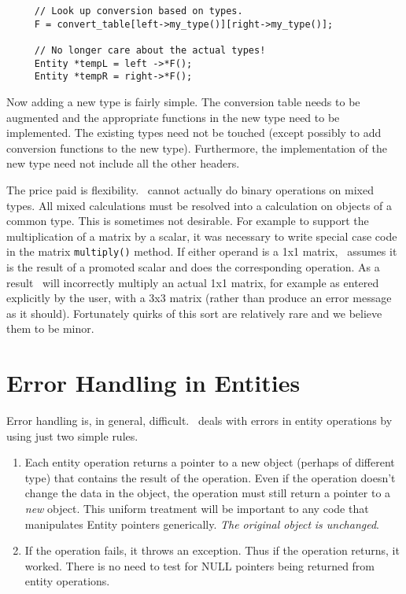 \documentclass{report}
\begin{document}
\begin{verbatim}
     // Look up conversion based on types.
     F = convert_table[left->my_type()][right->my_type()];

     // No longer care about the actual types!
     Entity *tempL = left ->*F();
     Entity *tempR = right->*F();
\end{verbatim}

Now adding a new type is fairly simple. The conversion table needs to be augmented and the
appropriate functions in the new type need to be implemented. The existing types need not be
touched (except possibly to add conversion functions to the new type). Furthermore, the
implementation of the new type need not include all the other headers.

The price paid is flexibility. \CLAC\ cannot actually do binary operations on mixed types. All
mixed calculations must be resolved into a calculation on objects of a common type. This is
sometimes not desirable. For example to support the multiplication of a matrix by a scalar, it
was necessary to write special case code in the matrix \texttt{multiply()} method. If either
operand is a 1x1 matrix, \CLAC\ assumes it is the result of a promoted scalar and does the
corresponding operation. As a result \CLAC\ will incorrectly multiply an actual 1x1 matrix, for
example as entered explicitly by the user, with a 3x3 matrix (rather than produce an error
message as it should). Fortunately quirks of this sort are relatively rare and we believe them
to be minor.

\section{Error Handling in Entities}

Error handling is, in general, difficult. \CLAC\ deals with errors in entity operations by using
just two simple rules.

\begin{enumerate}
  
\item Each entity operation returns a pointer to a new object (perhaps of different type) that
  contains the result of the operation. Even if the operation doesn't change the data in the
  object, the operation must still return a pointer to a \emph{new} object. This uniform
  treatment will be important to any code that manipulates Entity pointers generically.
  \emph{The original object} \emph{is unchanged}.
  
\item If the operation fails, it throws an exception. Thus if the operation returns, it worked.
  There is no need to test for NULL pointers being returned from entity operations.

\end{enumerate}
\end{document}
